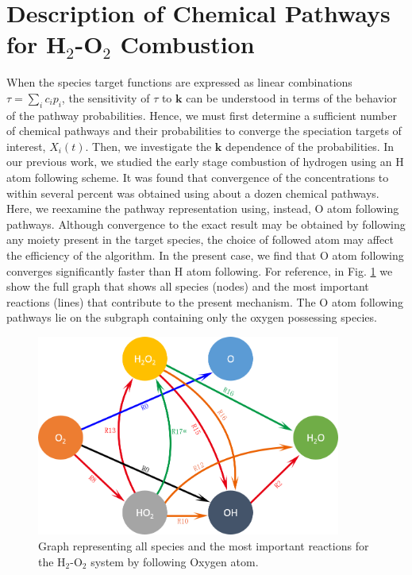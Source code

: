 \section{Description of Chemical Pathways for H$_2$-O$_2$ Combustion}
\label{Description_of_Chemical_Pathway}
When the species target functions are expressed as linear
combinations $\tau=\sum_{i}{c_ip_i}$, the sensitivity of $\tau$ to $\mathbf{k}$ can be
understood in terms of the behavior of the pathway
probabilities. Hence, we must first determine a sufficient
number of chemical pathways and their probabilities to
converge the speciation targets of interest, $ X_i(t)$. Then, we
investigate the $\mathbf{k}$ dependence of the probabilities. In our
previous work, we studied the early stage combustion of
hydrogen using an H atom following scheme. It was found that convergence of the concentrations to within several percent was
obtained using about a dozen chemical pathways. Here, we reexamine
the pathway representation using, instead, O atom
following pathways. Although convergence to the exact result
may be obtained by following any moiety present in the target
species, the choice of followed atom may affect the efficiency of
the algorithm. In the present case, we find that O atom
following converges significantly faster than H atom following.
For reference, in Fig. \ref{ch3:fig5} we show the full graph that shows all species (nodes) and the most important reactions (lines) that
contribute to the present mechanism. The O atom following
pathways lie on the subgraph containing only the oxygen
possessing species.
\begin{figure}[htbp]
	\caption[Oxygen subgraph of H$_2$-O$_2$ combustion system]{Graph representing all species and the most important reactions for the H$_2$-O$_2$ system by following Oxygen atom.}
    \begin{center}
	\includegraphics[width=100mm]{figs/chapter3/fig5.png}
    \end{center}
\label{ch3:fig5}
\end{figure}
\newline
